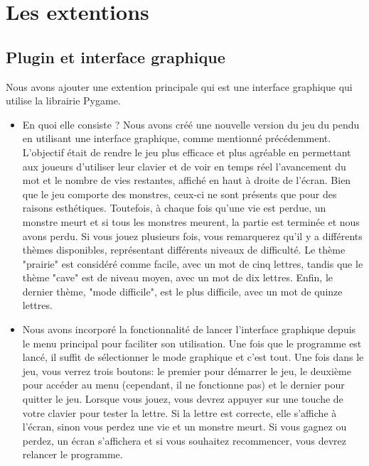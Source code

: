 \documentclass{article}
\begin{document}
\section{Les extentions}
\subsection{Plugin et interface graphique}

Nous avons ajouter une extention principale qui est une interface graphique qui utilise la librairie Pygame. 

\begin{itemize}
    \item En quoi elle consiste ? Nous avons créé une nouvelle version du jeu du pendu en utilisant une interface graphique, comme mentionné précédemment. L'objectif était de rendre le jeu plus efficace et plus agréable en permettant aux joueurs d'utiliser leur clavier et de voir en temps réel l'avancement du mot et le nombre de vies restantes, affiché en haut à droite de l'écran. Bien que le jeu comporte des monstres, ceux-ci ne sont présents que pour des raisons esthétiques. Toutefois, à chaque fois qu'une vie est perdue, un monstre meurt et si tous les monstres meurent, la partie est terminée et nous avons perdu. Si vous jouez plusieurs fois, vous remarquerez qu'il y a différents thèmes disponibles, représentant différents niveaux de difficulté. Le thème "prairie" est considéré comme facile, avec un mot de cinq lettres, tandis que le thème "cave" est de niveau moyen, avec un mot de dix lettres. Enfin, le dernier thème, "mode difficile", est le plus difficile, avec un mot de quinze lettres. 
    \item Nous avons incorporé la fonctionnalité de lancer l'interface graphique depuis le menu principal pour faciliter son utilisation. Une fois que le programme est lancé, il suffit de sélectionner le mode graphique et c'est tout. Une fois dans le jeu, vous verrez trois boutons: le premier pour démarrer le jeu, le deuxième pour accéder au menu (cependant, il ne fonctionne pas) et le dernier pour quitter le jeu. Lorsque vous jouez, vous devrez appuyer sur une touche de votre clavier pour tester la lettre. Si la lettre est correcte, elle s'affiche à l'écran, sinon vous perdez une vie et un monstre meurt. Si vous gagnez ou perdez, un écran s'affichera et si vous souhaitez recommencer, vous devrez relancer le programme.

\end{itemize}
\end{document}
